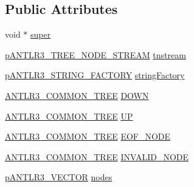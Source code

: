 \subsection*{Public Attributes}
\begin{DoxyCompactItemize}
\item 
void $\ast$ \hyperlink{struct_a_n_t_l_r3___c_o_m_m_o_n___t_r_e_e___n_o_d_e___s_t_r_e_a_m__struct_acbd1565a6e81ba861184e87f43364d8f}{super}
\item 
\hyperlink{antlr3interfaces_8h_a25ddc2865598f01e8bf33b52e1e60b63}{p\-A\-N\-T\-L\-R3\-\_\-\-T\-R\-E\-E\-\_\-\-N\-O\-D\-E\-\_\-\-S\-T\-R\-E\-A\-M} \hyperlink{struct_a_n_t_l_r3___c_o_m_m_o_n___t_r_e_e___n_o_d_e___s_t_r_e_a_m__struct_a7dcbf73066e7d4f6d39c0dfa9d501f07}{tnstream}
\item 
\hyperlink{antlr3interfaces_8h_a499a87287d582de04cf736f342b20692}{p\-A\-N\-T\-L\-R3\-\_\-\-S\-T\-R\-I\-N\-G\-\_\-\-F\-A\-C\-T\-O\-R\-Y} \hyperlink{struct_a_n_t_l_r3___c_o_m_m_o_n___t_r_e_e___n_o_d_e___s_t_r_e_a_m__struct_adc1830aba6e27f0d0c82304a1eb1b50c}{string\-Factory}
\item 
\hyperlink{antlr3commontree_8h_a4b5b654f2160825d74a1f69e924ae924}{A\-N\-T\-L\-R3\-\_\-\-C\-O\-M\-M\-O\-N\-\_\-\-T\-R\-E\-E} \hyperlink{struct_a_n_t_l_r3___c_o_m_m_o_n___t_r_e_e___n_o_d_e___s_t_r_e_a_m__struct_ab8892007f3fe4a458845a639044d684a}{D\-O\-W\-N}
\item 
\hyperlink{antlr3commontree_8h_a4b5b654f2160825d74a1f69e924ae924}{A\-N\-T\-L\-R3\-\_\-\-C\-O\-M\-M\-O\-N\-\_\-\-T\-R\-E\-E} \hyperlink{struct_a_n_t_l_r3___c_o_m_m_o_n___t_r_e_e___n_o_d_e___s_t_r_e_a_m__struct_adc912c8fdec213679fac4f8b598bbdb6}{U\-P}
\item 
\hyperlink{antlr3commontree_8h_a4b5b654f2160825d74a1f69e924ae924}{A\-N\-T\-L\-R3\-\_\-\-C\-O\-M\-M\-O\-N\-\_\-\-T\-R\-E\-E} \hyperlink{struct_a_n_t_l_r3___c_o_m_m_o_n___t_r_e_e___n_o_d_e___s_t_r_e_a_m__struct_aa8ffdbca7577793ed1a40a6bdec6aeb7}{E\-O\-F\-\_\-\-N\-O\-D\-E}
\item 
\hyperlink{antlr3commontree_8h_a4b5b654f2160825d74a1f69e924ae924}{A\-N\-T\-L\-R3\-\_\-\-C\-O\-M\-M\-O\-N\-\_\-\-T\-R\-E\-E} \hyperlink{struct_a_n_t_l_r3___c_o_m_m_o_n___t_r_e_e___n_o_d_e___s_t_r_e_a_m__struct_a4a86d5f237e6aecd764b6cab5921fc93}{I\-N\-V\-A\-L\-I\-D\-\_\-\-N\-O\-D\-E}
\item 
\hyperlink{antlr3interfaces_8h_a0dfeeada7529fbe1b968be84079b828f}{p\-A\-N\-T\-L\-R3\-\_\-\-V\-E\-C\-T\-O\-R} \hyperlink{struct_a_n_t_l_r3___c_o_m_m_o_n___t_r_e_e___n_o_d_e___s_t_r_e_a_m__struct_a9a3951a47f1a5c543d4402e4cb0f64ee}{nodes}

\end{DoxyCompactItemize}
